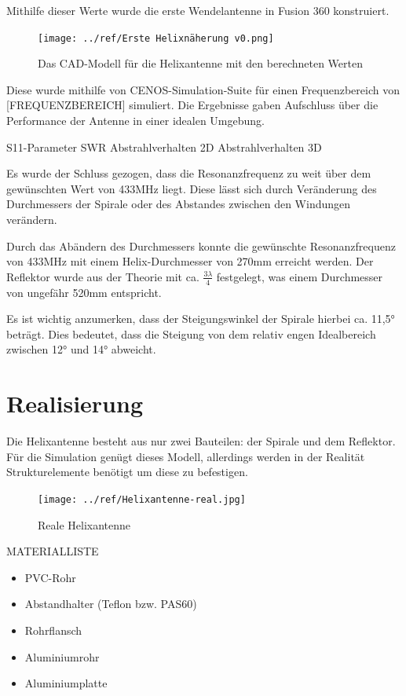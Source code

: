 Mithilfe dieser Werte wurde die erste Wendelantenne in Fusion 360 konstruiert. 

\begin{figure}[H]
	\centering
	\texttt{[image: ../ref/Erste Helixnäherung v0.png]}
	\label{fig:ersteHelixnäherung}
	\caption{Das CAD-Modell für die Helixantenne mit den berechneten Werten}
\end{figure}

Diese wurde mithilfe von CENOS-Simulation-Suite für einen Frequenzbereich von [FREQUENZBEREICH] simuliert. Die Ergebnisse gaben Aufschluss über die Performance der Antenne in einer idealen Umgebung.

S11-Parameter
SWR
Abstrahlverhalten 2D
Abstrahlverhalten 3D

Es wurde der Schluss gezogen, dass die Resonanzfrequenz zu weit über dem gewünschten Wert von 433MHz liegt. Diese lässt sich durch Veränderung des Durchmessers der Spirale oder des Abstandes zwischen den Windungen verändern.

Durch das Abändern des Durchmessers konnte die gewünschte Resonanzfrequenz von 433MHz mit einem Helix-Durchmesser von 270mm erreicht werden. Der Reflektor wurde aus der Theorie mit ca. $\frac{3\lambda}{4}$ festgelegt, was einem Durchmesser von ungefähr 520mm entspricht.

Es ist wichtig anzumerken, dass der Steigungswinkel der Spirale hierbei ca. 11,5° beträgt. Dies bedeutet, dass die Steigung von dem relativ engen Idealbereich zwischen 12° und 14° abweicht.

\section{Realisierung}
Die Helixantenne besteht aus nur zwei Bauteilen: der Spirale und dem Reflektor. Für die Simulation genügt dieses Modell, allerdings werden in der Realität Strukturelemente benötigt um diese zu befestigen.

\begin{figure}[H]
	\centering
	\texttt{[image: ../ref/Helixantenne-real.jpg]}
	\caption{Reale Helixantenne}
	\label{fig:helix-real}
\end{figure}

MATERIALLISTE
\begin{itemize}
	\item PVC-Rohr
	\item Abstandhalter (Teflon bzw. PAS60)
	\item Rohrflansch
	\item Aluminiumrohr
	\item Aluminiumplatte
\end{itemize}


